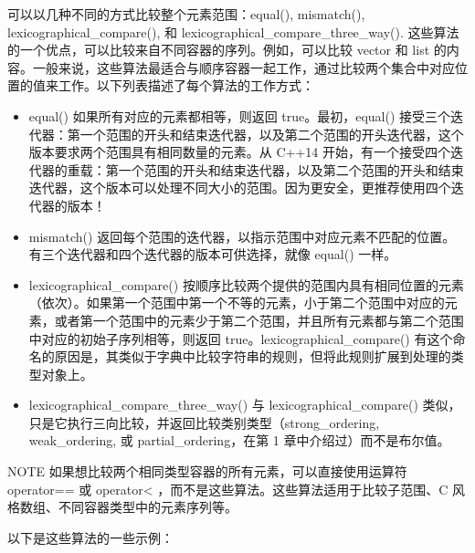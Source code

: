 可以以几种不同的方式比较整个元素范围：equal(), mismatch(), lexicographical\_compare(), 和 lexicographical\_compare\_three\_way(). 这些算法的一个优点，可以比较来自不同容器的序列。例如，可以比较 vector 和 list 的内容。一般来说，这些算法最适合与顺序容器一起工作，通过比较两个集合中对应位置的值来工作。以下列表描述了每个算法的工作方式：

\begin{itemize}
\item
equal() 如果所有对应的元素都相等，则返回 true。最初，equal() 接受三个迭代器：第一个范围的开头和结束迭代器，以及第二个范围的开头迭代器，这个版本要求两个范围具有相同数量的元素。从 C++14 开始，有一个接受四个迭代器的重载：第一个范围的开头和结束迭代器，以及第二个范围的开头和结束迭代器，这个版本可以处理不同大小的范围。因为更安全，更推荐使用四个迭代器的版本！

\item
mismatch() 返回每个范围的迭代器，以指示范围中对应元素不匹配的位置。有三个迭代器和四个迭代器的版本可供选择，就像 equal() 一样。

\item
lexicographical\_compare() 按顺序比较两个提供的范围内具有相同位置的元素（依次）。如果第一个范围中第一个不等的元素，小于第二个范围中对应的元素，或者第一个范围中的元素少于第二个范围，并且所有元素都与第二个范围中对应的初始子序列相等，则返回 true。lexicographical\_compare() 有这个命名的原因是，其类似于字典中比较字符串的规则，但将此规则扩展到处理的类型对象上。

\item
lexicographical\_compare\_three\_way() 与 lexicographical\_compare() 类似，只是它执行三向比较，并返回比较类别类型（strong\_ordering, weak\_ordering, 或 partial\_ordering，在第 1 章中介绍过）而不是布尔值。
\end{itemize}

\begin{myNotic}{NOTE}
如果想比较两个相同类型容器的所有元素，可以直接使用运算符operator== 或 operator< ，而不是这些算法。这些算法适用于比较子范围、C 风格数组、不同容器类型中的元素序列等。
\end{myNotic}

以下是这些算法的一些示例：

